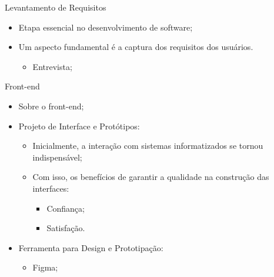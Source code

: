 \begin{frame}{Levantamento de Requisitos}
    \begin{itemize}
        \item Etapa essencial no desenvolvimento de software; \vspace{0.5cm}
        \item Um aspecto fundamental é a captura dos requisitos dos usuários. \vspace{0.25cm}
              \begin{itemize}
                  \item Entrevista; \vspace{0.25cm}
              \end{itemize}
    \end{itemize}
\end{frame}

\begin{frame}{Front-end}
    \begin{itemize}
        \item Sobre o front-end; \vspace{0.5cm}
        \item Projeto de Interface e Protótipos: \vspace{0.5cm}
              \begin{itemize}
                  \item Inicialmente, a interação com sistemas informatizados se tornou indispensável; \vspace{0.25cm}
                  \item Com isso, os benefícios de garantir a qualidade na construção das interfaces: \vspace{0.25cm}
                        \begin{itemize}
                            \item Confiança; \vspace{0.25cm}
                            \item Satisfação. \vspace{0.25cm}
                        \end{itemize}
              \end{itemize}
        \item Ferramenta para Design e Prototipação: \vspace{0.5cm}
              \begin{itemize}
                  \item Figma; \vspace{0.25cm}
              \end{itemize}
    \end{itemize}
\end{frame}

